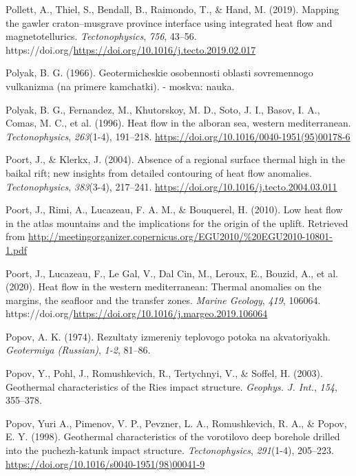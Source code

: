 \documentclass[draft,linenumbers]{agujournal2018}
\begin{document}
\leavevmode{}%
Pollett, A., Thiel, S., Bendall, B., Raimondo, T., \& Hand, M. (2019).
Mapping the gawler craton--musgrave province interface using integrated
heat flow and magnetotellurics. \emph{Tectonophysics}, \emph{756},
43--56.
https://doi.org/\url{https://doi.org/10.1016/j.tecto.2019.02.017}

\leavevmode{}%
Polyak, B. G. (1966). Geotermicheskie osobennosti oblasti sovremennogo
vulkanizma (na primere kamchatki). - moskva: nauka.

\leavevmode{}%
Polyak, B. G., Fernandez, M., Khutorskoy, M. D., Soto, J. I., Basov, I.
A., Comas, M. C., et al. (1996). Heat flow in the alboran sea, western
mediterranean. \emph{Tectonophysics}, \emph{263}(1-4), 191--218.
\url{https://doi.org/10.1016/0040-1951(95)00178-6}

\leavevmode{}%
Poort, J., \& Klerkx, J. (2004). Absence of a regional surface thermal
high in the baikal rift; new insights from detailed contouring of heat
flow anomalies. \emph{Tectonophysics}, \emph{383}(3-4), 217--241.
\url{https://doi.org/10.1016/j.tecto.2004.03.011}

\leavevmode{}%
Poort, J., Rimi, A., Lucazeau, F. A. M., \& Bouquerel, H. (2010). Low
heat flow in the atlas mountains and the implications for the origin of
the uplift. Retrieved from
\url{http://meetingorganizer.copernicus.org/EGU2010/\%20EGU2010-10801-1.pdf}

\leavevmode{}%
Poort, J., Lucazeau, F., Le Gal, V., Dal Cin, M., Leroux, E., Bouzid,
A., et al. (2020). Heat flow in the western mediterranean: Thermal
anomalies on the margins, the seafloor and the transfer zones.
\emph{Marine Geology}, \emph{419}, 106064.
https://doi.org/\url{https://doi.org/10.1016/j.margeo.2019.106064}

\leavevmode{}%
Popov, A. K. (1974). Rezultaty izmereniy teplovogo potoka na
akvatoriyakh. \emph{Geotermiya (Russian)}, \emph{1-2}, 81--86.

\leavevmode{}%
Popov, Y., Pohl, J., Romushkevich, R., Tertychnyi, V., \& Soffel, H.
(2003). Geothermal characteristics of the {Ries} impact structure.
\emph{Geophys. J. Int.}, \emph{154}, 355--378.

\leavevmode{}%
Popov, Yuri A., Pimenov, V. P., Pevzner, L. A., Romushkevich, R. A., \&
Popov, E. Y. (1998). Geothermal characteristics of the vorotilovo deep
borehole drilled into the puchezh-katunk impact structure.
\emph{Tectonophysics}, \emph{291}(1-4), 205--223.
\url{https://doi.org/10.1016/s0040-1951(98)00041-9}
\end{document}
